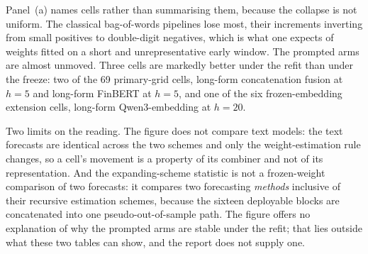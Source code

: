 Panel~(a) names cells rather than summarising them, because the collapse is
not uniform. The classical bag-of-words pipelines lose most, their increments
inverting from small positives to double-digit negatives, which is what one
expects of weights fitted on a short and unrepresentative early window. The
prompted arms are almost unmoved. Three cells are markedly better under
the refit than under the freeze: two of the 69 primary-grid cells, long-form
concatenation fusion at $h=5$ and long-form FinBERT at $h=5$, and one of the
six frozen-embedding extension cells, long-form Qwen3-embedding at
$h=20$. %

Two limits on the reading. The figure does not compare text models: the text
forecasts are identical across the two schemes and only the weight-estimation
rule changes, so a cell's movement is a property of its combiner and not of
its representation. And the expanding-scheme statistic is not a frozen-weight
comparison of two forecasts: it compares two forecasting \emph{methods}
inclusive of their recursive estimation schemes, because the sixteen
deployable blocks are concatenated into one pseudo-out-of-sample path. The
figure offers no explanation of why the prompted arms are stable under the
refit; that lies outside what these two tables can show, and the report does
not supply one.

